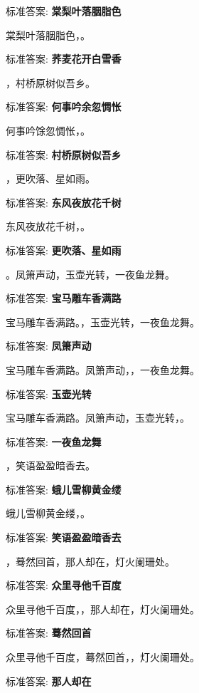 \documentclass[12pt, a4paper, addpoints]{exam}
\begin{document}
\begin{questions}
标准答案: \textbf{棠梨叶落胭脂色}

\question[1] 棠梨叶落胭脂色，\uline{\qquad\qquad\qquad}。

标准答案: \textbf{荞麦花开白雪香}

\question[1] \uline{\qquad\qquad\qquad}，村桥原树似吾乡。

标准答案: \textbf{何事吟余忽惆怅}

\question[1] 何事吟馀忽惆怅，\uline{\qquad\qquad\qquad}。

标准答案: \textbf{村桥原树似吾乡}

\question[1] \uline{\qquad\qquad\qquad}，更吹落、星如雨。

标准答案: \textbf{东风夜放花千树}

\question[1] 东风夜放花千树，\uline{\qquad\qquad\qquad}。

标准答案: \textbf{更吹落、星如雨}

\question[1] \uline{\qquad\qquad\qquad}。凤箫声动，玉壶光转，一夜鱼龙舞。

标准答案: \textbf{宝马雕车香满路}

\question[1] 宝马雕车香满路。\uline{\qquad\qquad\qquad}，玉壶光转，一夜鱼龙舞。

标准答案: \textbf{凤箫声动}

\question[1] 宝马雕车香满路。凤箫声动，\uline{\qquad\qquad\qquad}，一夜鱼龙舞。

标准答案: \textbf{玉壶光转}

\question[1] 宝马雕车香满路。凤箫声动，玉壶光转，\uline{\qquad\qquad\qquad}。

标准答案: \textbf{一夜鱼龙舞}

\question[1] \uline{\qquad\qquad\qquad}，笑语盈盈暗香去。

标准答案: \textbf{蛾儿雪柳黄金缕}

\question[1] 蛾儿雪柳黄金缕，\uline{\qquad\qquad\qquad}。

标准答案: \textbf{笑语盈盈暗香去}

\question[1] \uline{\qquad\qquad\qquad}，蓦然回首，那人却在，灯火阑珊处。

标准答案: \textbf{众里寻他千百度}

\question[1] 众里寻他千百度，\uline{\qquad\qquad\qquad}，那人却在，灯火阑珊处。

标准答案: \textbf{蓦然回首}

\question[1] 众里寻他千百度，蓦然回首，\uline{\qquad\qquad\qquad}，灯火阑珊处。

标准答案: \textbf{那人却在}


\end{questions}
\end{document}
